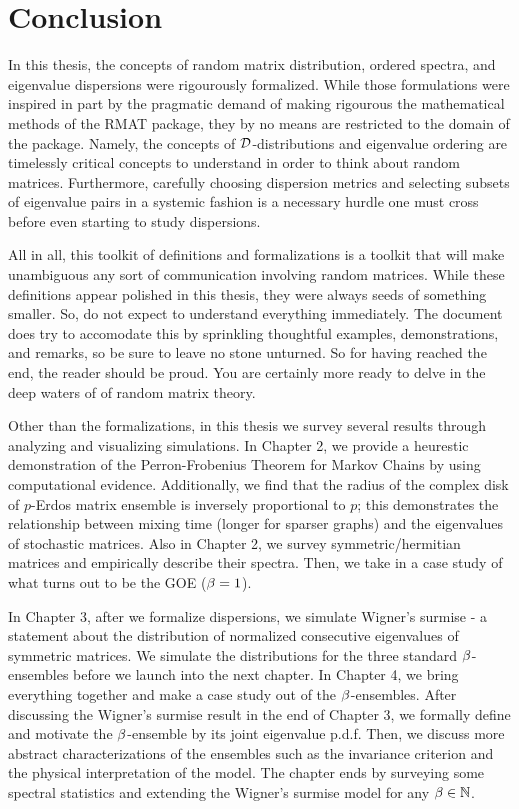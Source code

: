 
  \chapter*{Conclusion}

\medskip

In this thesis, the concepts of random matrix distribution, ordered spectra, and eigenvalue dispersions were rigourously formalized.
While those formulations were inspired in part by the pragmatic demand of making rigourous the mathematical methods of the RMAT package, they by no means are restricted to the domain of the package.
Namely, the concepts of $\mathcal{D}$-distributions and eigenvalue ordering are timelessly critical concepts to understand in order to think about random matrices.
Furthermore, carefully choosing dispersion metrics and selecting subsets of eigenvalue pairs in a systemic fashion is a necessary hurdle one must cross before even starting to study dispersions.

All in all, this toolkit of definitions and formalizations is a toolkit that will make unambiguous any sort of communication involving random matrices.
While these definitions appear polished in this thesis, they were always seeds of something smaller.
So, do not expect to understand everything immediately.
The document does try to accomodate this by sprinkling thoughtful examples, demonstrations, and remarks, so be sure to leave no stone unturned.
So for having reached the end, the reader should be proud. You are certainly more ready to delve in the deep waters of of random matrix theory.

Other than the formalizations, in this thesis we survey several results through analyzing and visualizing simulations.
In Chapter 2, we provide a heurestic demonstration of the Perron-Frobenius Theorem for Markov Chains by using computational evidence.
Additionally, we find that the radius of the complex disk of $p$-Erdos matrix ensemble is inversely proportional to $p$;
this demonstrates the relationship between mixing time (longer for sparser graphs) and the eigenvalues of stochastic matrices.
Also in Chapter 2, we survey symmetric/hermitian matrices and empirically describe their spectra.
Then, we take in a case study of what turns out to be the GOE ($\beta = 1$).

In Chapter 3, after we formalize dispersions, we simulate Wigner's surmise - a statement about the distribution of normalized consecutive eigenvalues of symmetric matrices.
We simulate the distributions for the three standard $\beta$-ensembles before we launch into the next chapter. In Chapter 4, we bring everything together and make a case study out of the $\beta$-ensembles. After discussing the Wigner's surmise result in the end of Chapter 3, we formally define and motivate the $\beta$-ensemble by its joint eigenvalue p.d.f. Then, we discuss more abstract characterizations of the ensembles such as the invariance criterion and the physical interpretation of the model. The chapter ends by surveying some spectral statistics and extending the Wigner's surmise model for any $\beta \in \mathbb{N}$.

